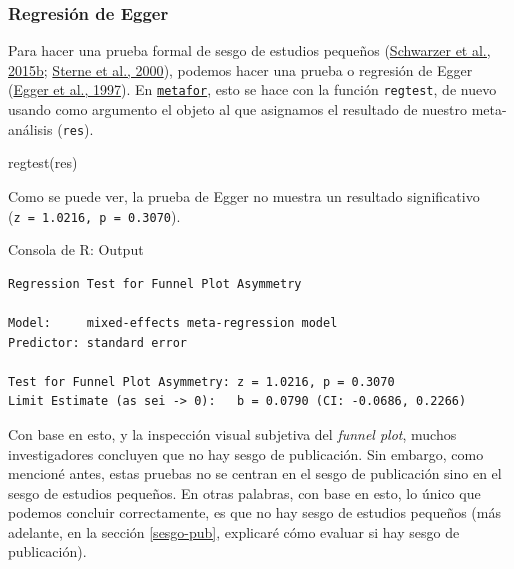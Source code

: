 \documentclass[
  bookmarksnumbered]{article}
\newenvironment{Shaded}{\begin{snugshade}}{\end{snugshade}}
\newcommand{\FunctionTok}[1]{\textcolor[rgb]{0.39,0.29,0.61}{#1}}
\newcommand{\NormalTok}[1]{\textcolor[rgb]{0.12,0.11,0.11}{#1}}
\begin{document}
\hypertarget{reg-egger}{%
\subsubsection{Regresión de Egger}\label{reg-egger}}

Para hacer una prueba formal de sesgo de estudios pequeños (\protect\hyperlink{ref-schwarzerSmallStudyEffectsMetaAnalysis2015}{Schwarzer et al., 2015b}; \protect\hyperlink{ref-sternePublicationRelatedBias2000}{Sterne et al., 2000}), podemos hacer una prueba o regresión de Egger (\protect\hyperlink{ref-eggerBiasMetaanalysisDetected1997}{Egger et al., 1997}). En \href{https://www.metafor-project.org/doku.php}{\texttt{metafor}}, esto se hace con la función \texttt{regtest}, de nuevo usando como argumento el objeto al que asignamos el resultado de nuestro meta-análisis (\texttt{res}).

\begin{Shaded}
\begin{Highlighting}[]
\FunctionTok{regtest}\NormalTok{(res)}
\end{Highlighting}
\end{Shaded}

Como se puede ver, la prueba de Egger no muestra un resultado significativo (\texttt{z\ =\ 1.0216,\ p\ =\ 0.3070}).

\begin{ROut}{Consola de R: Output~\thetcbcounter}
                \begin{footnotesize}
                \begin{verbatim} 
Regression Test for Funnel Plot Asymmetry

Model:     mixed-effects meta-regression model
Predictor: standard error

Test for Funnel Plot Asymmetry: z = 1.0216, p = 0.3070
Limit Estimate (as sei -> 0):   b = 0.0790 (CI: -0.0686, 0.2266)
 \end{verbatim}
                \end{footnotesize}
                \end{ROut}

Con base en esto, y la inspección visual subjetiva del \emph{funnel plot}, muchos investigadores concluyen que no hay sesgo de publicación. Sin embargo, como mencioné antes, estas pruebas no se centran en el sesgo de publicación sino en el sesgo de estudios pequeños. En otras palabras, con base en esto, lo único que podemos concluir correctamente, es que no hay sesgo de estudios pequeños (más adelante, en la sección \ref{sesgo-pub}, explicaré cómo evaluar si hay sesgo de publicación).
\end{document}
